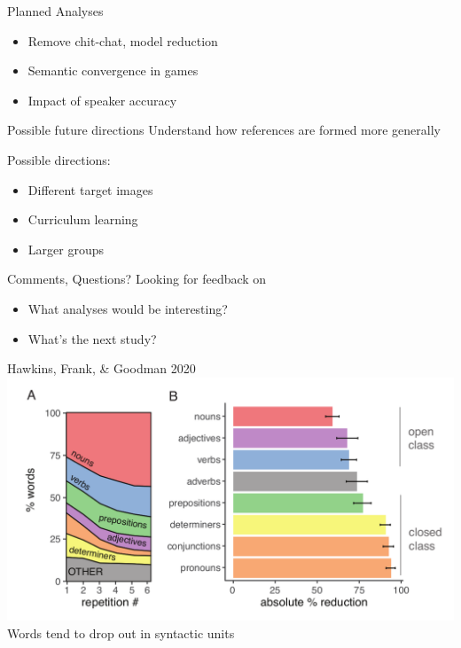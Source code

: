 \documentclass[ 12pt, xcolor=beamer,table,usenames,dvipsnames, ignorenonframetext, ngerman]{beamer}
\begin{document}
\begin{frame}{Planned Analyses}
	\begin{itemize}
		\item Remove chit-chat, model reduction
		\item Semantic convergence in games
		\item Impact of speaker accuracy
	\end{itemize}
\end{frame}


\begin{frame}{Possible future directions}
	Understand how references are formed more generally \pause
	
	Possible directions: \pause
\begin{itemize}
	\item Different target images \pause
	\item Curriculum learning \pause
	\item Larger groups
\end{itemize}

\end{frame}

\begin{frame}{Comments, Questions?}
	Looking for feedback on
	\smallskip
	\begin{itemize}
	\item What analyses would be interesting?
	\item What's the next study?
	\end{itemize}
\end{frame}

\appendix

\begin{frame}{Hawkins, Frank, \& Goodman 2020}
	\includegraphics[width=\textwidth]{../images/hawkins_pos.png}
	Words tend to drop out in syntactic units
\end{frame}
\end{document}
